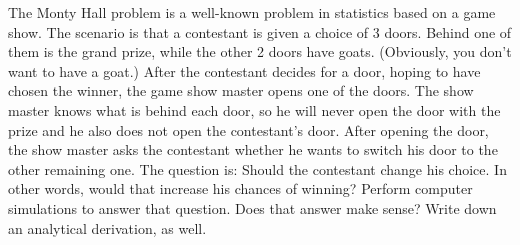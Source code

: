 \documentclass[10pt, physics, diagram]{homework}
\begin{document}
	\begin{problem}[12pts]
		The Monty Hall problem is a well-known problem in statistics based on a game show. The scenario is that a contestant is given a choice of 3 doors. Behind one of them is the grand prize, while the other 2 doors have goats. (Obviously, you don’t want to have a goat.) After the contestant decides for a door, hoping to have chosen the winner, the game show master opens one of the doors. The show master knows what is behind each door, so he will never open the door with the prize and he also does not open the contestant’s door. After opening the door, the show master asks the contestant whether he wants to switch his door to the other remaining one. The question is: Should the contestant change his choice. In other words, would that increase his chances of winning? Perform computer simulations to answer that question. Does that answer make sense? Write down an analytical derivation, as well.
	\end{problem}
\end{document}
